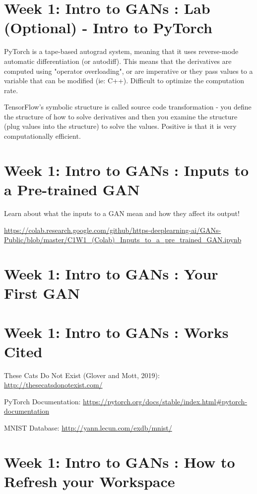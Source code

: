 \documentclass[11pt, onecolumn]{article}
\begin{document}
\clearpage
\section{Week 1: Intro to GANs : Lab (Optional) - Intro to PyTorch}

PyTorch is a tape-based autograd system, meaning that it uses reverse-mode automatic differentiation (or autodiff). This means that the derivatives are computed using "operator overloading", or are imperative or they pass values to a variable that can be modified (ie: C++).  Difficult to optimize the computation rate.

TensorFlow's symbolic structure is called source code transformation - you define the structure of how to solve derivatives and then you examine the structure (plug values into the structure) to solve the values.  Positive is that it is very computationally efficient.


\section{Week 1: Intro to GANs : Inputs to a Pre-trained GAN}

Learn about what the inputs to a GAN mean and how they affect its output!

\url{https://colab.research.google.com/github/https-deeplearning-ai/GANs-Public/blob/master/C1W1_(Colab)_Inputs_to_a_pre_trained_GAN.ipynb}


\section{Week 1: Intro to GANs : Your First GAN}



\section{Week 1: Intro to GANs : Works Cited}

These Cats Do Not Exist (Glover and Mott, 2019): \url{http://thesecatsdonotexist.com/}

PyTorch Documentation: \url{https://pytorch.org/docs/stable/index.html#pytorch-documentation}

MNIST Database: \url{http://yann.lecun.com/exdb/mnist/}


\section{Week 1: Intro to GANs : How to Refresh your Workspace}
\end{document}
